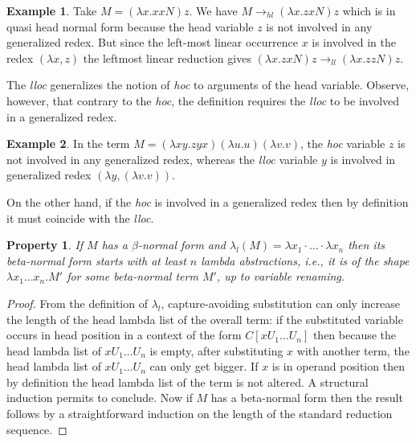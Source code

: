 \documentclass{elsarticle}
\makeatletter
\theoremstyle{plain}
\newtheorem{property}[theorem]{Property}
\theoremstyle{definition}
\newtheorem{example}{Example}[section]
\renewcommand\ie{{\it i.e.\@\xspace}}
\newcommand{\hlred}{\rightarrow_{hl}}
\newcommand{\llred}{\rightarrow_{ll}}
\makeatother
\begin{document}
\begin{example}
Take $M = (\lambda x. x x N) z$. We have $M \hlred (\lambda x. z x N) z$ which is in quasi head normal form because the head variable $z$ is not involved in any generalized redex.
But since the left-most linear occurrence $x$ is involved in the redex $(\lambda x, z)$ the leftmost linear reduction gives $(\lambda x. z x N) z \llred (\lambda x. z z N) z$.
\end{example}

The \emph{lloc} generalizes the notion of \emph{hoc} to arguments of the head variable. Observe, however, that contrary to the \emph{hoc}, the definition requires the \emph{lloc} to be involved in a generalized redex.
\begin{example}In the term $M = (\lambda x y . z y x) (\lambda u . u) (\lambda v . v)$, the \emph{hoc} variable $z$ is not involved in any generalized redex, whereas the \emph{lloc} variable $y$ is involved in generalized redex $(\lambda y, (\lambda v.v))$.
\end{example}
On the other hand, if the \emph{hoc} is involved in a generalized redex then by definition it must coincide with the \emph{lloc}.

\begin{property}
If $M$ has a $\beta$-normal form and $\lambda_l(M) = \lambda x_1 \cdot \ldots \cdot \lambda x_n$ then its beta-normal form starts with at least $n$ lambda abstractions, \ie, it is of the shape $\lambda x_1 \ldots x_n . M'$ for some beta-normal term $M'$, up to variable renaming.
\end{property}
\begin{proof}
From the definition of $\lambda_l$, capture-avoiding substitution can only increase the length of the head lambda list of the overall term: if the substituted variable occurs in head position in a context of the form $C[x U_1 \ldots U_n]$ then because the head lambda list of $x U_1 \ldots U_n$ is empty, after substituting $x$ with another term, the head lambda list of $x U_1 \ldots U_n$ can only get bigger. If $x$ is in operand position then by definition the head lambda list of the term is not altered. A structural induction permits to conclude.
Now if $M$ has a beta-normal form then the result follows by a straightforward induction on the length of the standard reduction sequence.
\end{proof}
\end{document}
